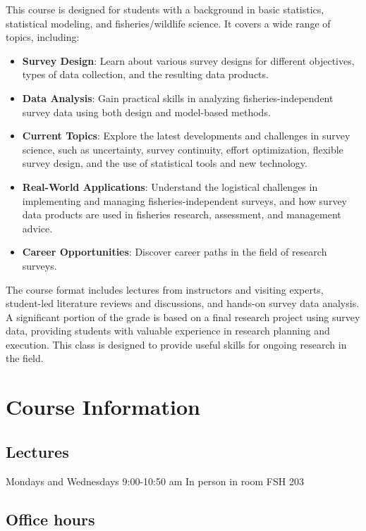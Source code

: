 \documentclass[
  letterpaper,
  oneside,
  open=any]{scrbook}
\providecommand{\tightlist}{%
  \setlength{\itemsep}{0pt}\setlength{\parskip}{0pt}}\usepackage{longtable,booktabs,array}
\begin{document}
This course is designed for students with a background in basic
statistics, statistical modeling, and fisheries/wildlife science. It
covers a wide range of topics, including:

\begin{itemize}
\tightlist
\item
  \textbf{Survey Design}: Learn about various survey designs for
  different objectives, types of data collection, and the resulting data
  products.
\item
  \textbf{Data Analysis}: Gain practical skills in analyzing
  fisheries-independent survey data using both design and model-based
  methods.
\item
  \textbf{Current Topics}: Explore the latest developments and
  challenges in survey science, such as uncertainty, survey continuity,
  effort optimization, flexible survey design, and the use of
  statistical tools and new technology.
\item
  \textbf{Real-World Applications}: Understand the logistical challenges
  in implementing and managing fisheries-independent surveys, and how
  survey data products are used in fisheries research, assessment, and
  management advice.
\item
  \textbf{Career Opportunities}: Discover career paths in the field of
  research surveys.
\end{itemize}

The course format includes lectures from instructors and visiting
experts, student-led literature reviews and discussions, and hands-on
survey data analysis. A significant portion of the grade is based on a
final research project using survey data, providing students with
valuable experience in research planning and execution. This class is
designed to provide useful skills for ongoing research in the field.


\chapter{Course Information}\label{course-information}

\section{Lectures}\label{lectures}

Mondays and Wednesdays 9:00-10:50 am In person in room FSH 203

\section{Office hours}\label{office-hours}
\end{document}
